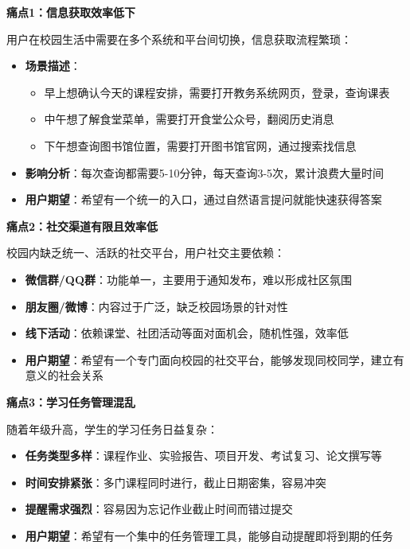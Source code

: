 \documentclass[12pt,a4paper]{article}
\begin{document}
\textbf{痛点1：信息获取效率低下}

用户在校园生活中需要在多个系统和平台间切换，信息获取流程繁琐：

\begin{itemize}
    \item \textbf{场景描述}：
        \begin{itemize}
            \item 早上想确认今天的课程安排，需要打开教务系统网页，登录，查询课表
            \item 中午想了解食堂菜单，需要打开食堂公众号，翻阅历史消息
            \item 下午想查询图书馆位置，需要打开图书馆官网，通过搜索找信息
        \end{itemize}
    \item \textbf{影响分析}：每次查询都需要5-10分钟，每天查询3-5次，累计浪费大量时间
    \item \textbf{用户期望}：希望有一个统一的入口，通过自然语言提问就能快速获得答案
\end{itemize}

\textbf{痛点2：社交渠道有限且效率低}

校园内缺乏统一、活跃的社交平台，用户社交主要依赖：

\begin{itemize}
    \item \textbf{微信群/QQ群}：功能单一，主要用于通知发布，难以形成社区氛围
    \item \textbf{朋友圈/微博}：内容过于广泛，缺乏校园场景的针对性
    \item \textbf{线下活动}：依赖课堂、社团活动等面对面机会，随机性强，效率低
    \item \textbf{用户期望}：希望有一个专门面向校园的社交平台，能够发现同校同学，建立有意义的社会关系
\end{itemize}

\textbf{痛点3：学习任务管理混乱}

随着年级升高，学生的学习任务日益复杂：

\begin{itemize}
    \item \textbf{任务类型多样}：课程作业、实验报告、项目开发、考试复习、论文撰写等
    \item \textbf{时间安排紧张}：多门课程同时进行，截止日期密集，容易冲突
    \item \textbf{提醒需求强烈}：容易因为忘记作业截止时间而错过提交
    \item \textbf{用户期望}：希望有一个集中的任务管理工具，能够自动提醒即将到期的任务
\end{itemize}
\end{document}
